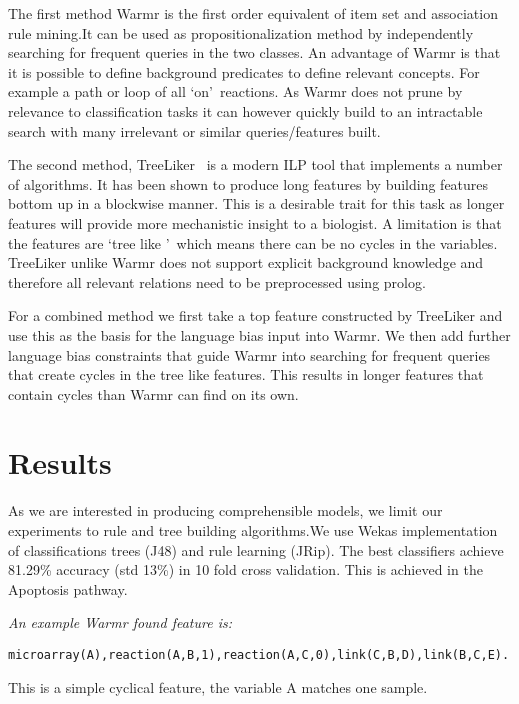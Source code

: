 \documentclass[runningheads,a4paper]{llncs}
\begin{document}
The first method Warmr \citep{dehaspe_mining_1997} is the first order equivalent of item set and association rule mining.It can be used as propositionalization method by independently searching for frequent queries in the two classes. An advantage of Warmr is that it is possible to define background predicates to define relevant concepts. For example a path or loop of all \lq on\rq\ reactions. As Warmr does not prune by relevance to classification tasks it can however quickly build to an intractable search with many irrelevant or similar queries/features built. 
	     

The second method, TreeLiker~\citep{vzelezny2013fast} is a modern ILP tool that implements a number of algorithms. It has been shown to produce long features by building features bottom up in a blockwise manner. This is a desirable trait for  this task as longer features will provide more mechanistic insight to a biologist. A limitation is that the features are \lq tree like \rq\ which means there can be no cycles in the variables. TreeLiker unlike Warmr does not support explicit background knowledge and therefore all relevant relations need to be preprocessed using prolog.

For a combined method we first take a top feature constructed by TreeLiker and use this as the basis for the language bias input into Warmr. We then add further language bias constraints that guide Warmr into searching for frequent queries that create cycles in the tree like features. This results in longer features that contain cycles than Warmr can find on its own. 
	     
	     
\section{Results}
As we are interested in producing comprehensible models, we limit our experiments to rule and tree building algorithms.We use Wekas implementation of classifications trees (J48) and rule learning (JRip). The best classifiers achieve 81.29\% accuracy (std 13\%)  in 10 fold cross validation. This is achieved in the Apoptosis pathway.

\noindent
{\it{An example Warmr found feature is:}}
\begin{verbatim}
microarray(A),reaction(A,B,1),reaction(A,C,0),link(C,B,D),link(B,C,E).
\end{verbatim}
\noindent 
This is a simple cyclical feature, the variable A matches one sample. 
\newline
\newline
\end{document}
